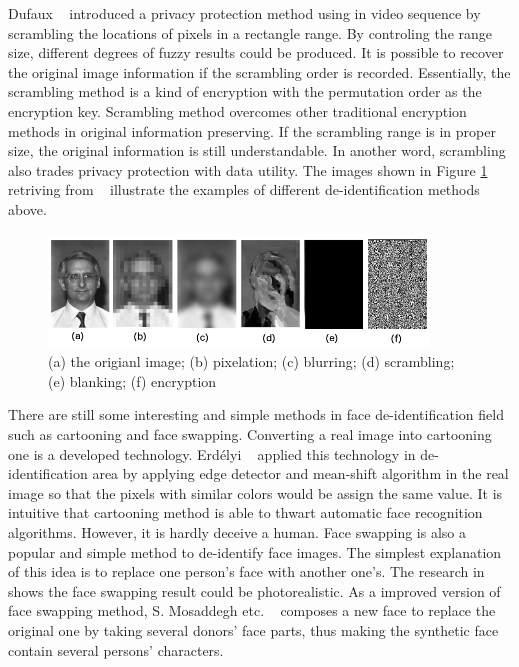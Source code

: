 	\par
	Dufaux ~\cite{dufaux08} introduced a privacy protection method using in video sequence by scrambling the locations of pixels in a rectangle range. By controling the range size, different degrees of fuzzy results could be produced. It is possible to recover the original image information if the scrambling order is recorded. Essentially, the scrambling method is a kind of encryption with the permutation order as the encryption key. Scrambling method overcomes other traditional encryption methods in original information preserving. If the scrambling range is in proper size, the original information is still understandable. In another word, scrambling also trades privacy protection with data utility. The images shown in Figure \ref{adhoc_example} retriving from ~\cite{dufaux08} illustrate the examples of different de-identification methods above. 
	\begin{figure}[!htb]
		  \centering
		  \includegraphics[width=0.9\textwidth]{figure/adhoc.png} 
		  \caption{(a) the origianl image; (b) pixelation; (c) blurring; (d) scrambling; (e) blanking; (f) encryption}
		  \label{adhoc_example}
	\end{figure}

	\par
	There are still some interesting and simple methods in face de-identification field such as cartooning and face swapping. Converting a real image into cartooning one is a developed technology. Erdélyi ~\cite{erdely14} applied this technology in de-identification area by applying edge detector and mean-shift algorithm in the real image so that the pixels with similar colors would be assign the same value. It is intuitive that cartooning method is able to thwart automatic face recognition algorithms. However, it is hardly deceive a human. Face swapping is also a popular and simple method to de-identify face images. The simplest explanation of this idea is to replace one person's face with another one's. The research in ~\cite{CAVE08} shows the face swapping result could be photorealistic. As a improved version of face swapping method, S. Mosaddegh etc. ~\cite{Mosa14} composes a new face to replace the original one by taking several donors' face parts, thus making the synthetic face contain several persons' characters. 


